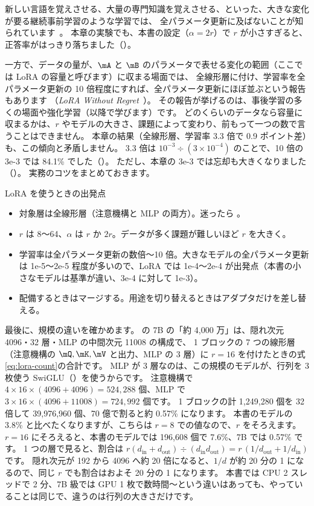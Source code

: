 新しい言語を覚えさせる、大量の専門知識を覚えさせる、といった、大きな変化が要る継続事前学習のような学習では、
全パラメータ更新に及ばないことが知られています~\cite{biderman2024lora}。
本章の実験でも、本書の設定（$\alpha=2r$）で $r$ が小さすぎると、正答率がはっきり落ちました（）。

一方で、データの量が、$\mA$ と $\mB$ のパラメータで表せる変化の範囲（ここでは LoRA の容量と呼びます）に収まる場面では、
全線形層に付け、学習率を全パラメータ更新の 10 倍程度にすれば、全パラメータ更新にほぼ並ぶという報告もあります
（\textit{LoRA Without Regret}~\cite{schulman2025lora}）。
その報告が挙げるのは、事後学習の多くの場面や強化学習（以降で学びます）です。
どのくらいのデータなら容量に収まるかは、$r$ やモデルの大きさ、課題によって変わり、前もって一つの数で言うことはできません。
本章の結果（全線形層、学習率 3.3 倍で 0.9 ポイント差）も、この傾向と矛盾しません。
3.3 倍は $10^{-3}\div(3\times10^{-4})$ のことで、10 倍の 3e-3 では 84.1\% でした（）。
ただし、本章の 3e-3 では忘却も大きくなりました（）。
実務のコツをまとめておきます。

\begin{practice}{LoRA を使うときの出発点}
\begin{itemize}
\item 対象層は全線形層（注意機構と MLP の両方）。迷ったら 。
\item $r$ は 8〜64、$\alpha$ は $r$ か $2r$。データが多く課題が難しいほど $r$ を大きく。
\item 学習率は全パラメータ更新の数倍〜10 倍。大きなモデルの全パラメータ更新は 1e-5〜2e-5 程度が多いので、LoRA では 1e-4〜2e-4 が出発点（本書の小さなモデルは基準が違い、3e-4 に対して 1e-3）。
\item 配備するときはマージする。用途を切り替えるときはアダプタだけを差し替える。
\end{itemize}
\end{practice}

最後に、規模の違いを確かめます。
の 7B の「約 4,000 万」は、隠れ次元 4096・32 層・MLP の中間次元 11008 の構成で、
1 ブロックの 7 つの線形層（注意機構の $\mQ,\mK,\mV$ と出力、MLP の 3 層）に $r=16$ を付けたときの式\eqref{eq:lora-count}の合計です。
MLP が 3 層なのは、この規模のモデルが、行列を 3 枚使う SwiGLU（）を使うからです。
注意機構で $4\times16\times(4096+4096)=524{,}288$ 個、MLP で $3\times16\times(4096+11008)=724{,}992$ 個です。
1 ブロックの計 1,249,280 個を 32 倍して 39,976,960 個、70 億で割ると約 0.57\% になります。
本書のモデルの 3.8\% と比べたくなりますが、こちらは $r=8$ での値なので、$r$ をそろえます。
$r=16$ にそろえると、本書のモデルでは 196,608 個で 7.6\%、7B では 0.57\% です。
1 つの層で見ると、割合は $r(d_{\text{in}}+d_{\text{out}})\div(d_{\text{in}}d_{\text{out}})=r\,(1/d_{\text{out}}+1/d_{\text{in}})$ です。
隠れ次元が 192 から 4096 へ約 20 倍になると、$1/d$ が約 20 分の 1 になるので、同じ $r$ でも割合はおよそ 20 分の 1 になります。
本書では CPU 2 スレッドで 2 分、7B 級では GPU 1 枚で数時間〜という違いはあっても、やっていることは同じで、違うのは行列の大きさだけです。

